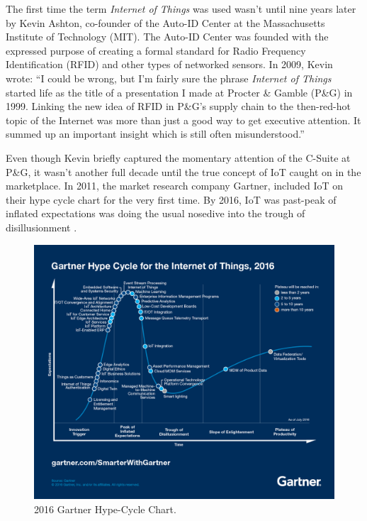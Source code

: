 \documentclass[sigconf]{acmart}
\begin{document}
The first time the term {\em Internet of Things} was used wasn't until nine years later by Kevin Ashton, co-founder of the Auto-ID Center at the Massachusetts Institute of Technology (MIT). The Auto-ID Center was founded with the expressed purpose of creating a formal standard for Radio Frequency Identification (RFID) and other types of networked sensors. In 2009, Kevin wrote\cite{Ashton01}: ``I could be wrong, but I'm fairly sure the phrase {\em Internet of Things} started life as the title of a presentation I made at Procter \& Gamble (P\&G) in 1999. Linking the new idea of RFID in P\&G's supply chain to the then-red-hot topic of the Internet was more than just a good way to get executive attention. It summed up an important insight which is still often misunderstood.''
\par
Even though Kevin briefly captured the momentary attention of the C-Suite at P\&G, it wasn't another full decade until the true concept of IoT caught on in the marketplace. In 2011, the market research company Gartner, included IoT on their hype cycle chart for the very first time. By 2016, IoT was past-peak of inflated expectations was doing the usual nosedive into the trough of disillusionment \cite{Gartner2017}.

\begin{figure}
  \includegraphics[width=\linewidth]{images/gartner2016.png}
  \caption{2016 Gartner Hype-Cycle Chart.}
  \label{fig:Gartner2016}
\end{figure}
\end{document}
